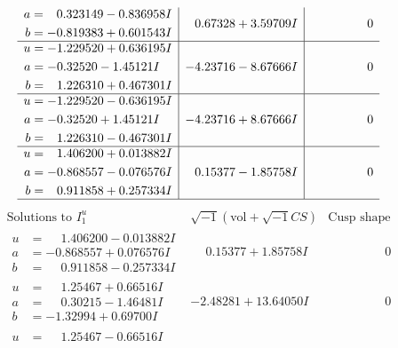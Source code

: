 \documentclass[1p]{elsarticle_modified}
\theoremstyle{definition}
\newcommand{\I}{\sqrt{-1}}
\begin{document}
$$\begin{array}{c|c|c}
\begin{aligned}
a &= \phantom{-}0.323149 - 0.836958 I \\
b &= -0.819383 + 0.601543 I\end{aligned}
 & \phantom{-}0.67328 + 3.59709 I & \phantom{-0.000000 } 0 \\ \hline\begin{aligned}
u &= -1.229520 + 0.636195 I \\
a &= -0.32520 - 1.45121 I \\
b &= \phantom{-}1.226310 + 0.467301 I\end{aligned}
 & -4.23716 - 8.67666 I & \phantom{-0.000000 } 0 \\ \hline\begin{aligned}
u &= -1.229520 - 0.636195 I \\
a &= -0.32520 + 1.45121 I \\
b &= \phantom{-}1.226310 - 0.467301 I\end{aligned}
 & -4.23716 + 8.67666 I & \phantom{-0.000000 } 0 \\ \hline\begin{aligned}
u &= \phantom{-}1.406200 + 0.013882 I \\
a &= -0.868557 - 0.076576 I \\
b &= \phantom{-}0.911858 + 0.257334 I\end{aligned}
 & \phantom{-}0.15377 - 1.85758 I & \phantom{-0.000000 } 0\\
 \hline 
 \end{array}$$\newpage$$\begin{array}{c|c|c}  
\text{Solutions to }I^u_{1}& \I (\text{vol} + \sqrt{-1}CS) & \text{Cusp shape}\\
 \hline 
\begin{aligned}
u &= \phantom{-}1.406200 - 0.013882 I \\
a &= -0.868557 + 0.076576 I \\
b &= \phantom{-}0.911858 - 0.257334 I\end{aligned}
 & \phantom{-}0.15377 + 1.85758 I & \phantom{-0.000000 } 0 \\ \hline\begin{aligned}
u &= \phantom{-}1.25467 + 0.66516 I \\
a &= \phantom{-}0.30215 - 1.46481 I \\
b &= -1.32994 + 0.69700 I\end{aligned}
 & -2.48281 + 13.64050 I & \phantom{-0.000000 } 0 \\ \hline\begin{aligned}
u &= \phantom{-}1.25467 - 0.66516 I \\

\end{aligned}
\end{array}$$
\end{document}
